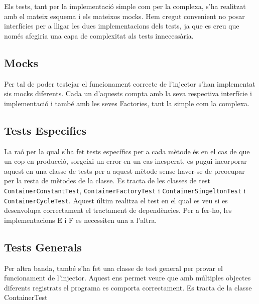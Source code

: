 
	Els tests, tant per la implementació simple com per la complexa, s'ha realitzat amb el mateix esquema i els mateixos mocks.
	Hem cregut convenient no posar interfícies per a lligar les dues implementacions dels tests, ja que es creu que només afegiria
	una capa de complexitat als tests innecessària.
\subsection{Mocks}
Per tal de poder testejar el funcionament correcte de l'injector s'han implementat sis mocks diferents. 
Cada un d'aquests compta amb la seva respectiva interfície i implementació i també amb les seves Factories, 
tant la simple com la complexa.
\subsection{Tests Especifics}
La raó per la qual s'ha fet tests específics per a cada mètode és en el cas de que un cop en producció, sorgeixi
un error en un cas inesperat, es pugui incorporar aquest en una classe de tests per a aquest mètode sense haver-se
de preocupar per la resta de mètodes de la classe.
Es tracta de les classes de test \texttt{ContainerConstantTest}, \texttt{ContainerFactoryTest} i 
\texttt{ContainerSingeltonTest} i \texttt{ContainerCycleTest}. Aquest últim realitza el test en el qual es veu
si es desenvolupa correctament el tractament de dependències. Per a fer-ho, les implementacions E i F es necessiten
una a l'altra.
\subsection{Tests Generals}
Per altra banda, també s'ha fet una classe de test general per provar el funcionament de l'injector. 
Aquest ens permet veure que amb múltiples objectes diferents registrats el programa es comporta correctament.
Es tracta de la classe ContainerTest
